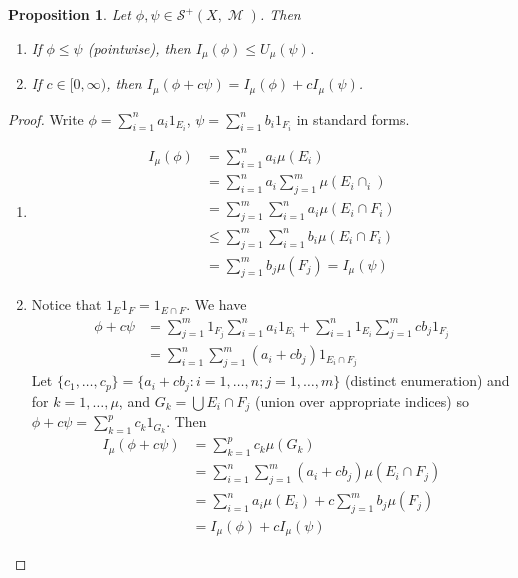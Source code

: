 \documentclass[12pt, a4paper]{memoir}
\newtheorem{proposition}[theorem]{Proposition}
\theoremstyle{nonumberplain}
\newtheorem{proof}{Proof}
\DeclareMathOperator{\M}{\mathcal{M}}
\begin{document}
\begin{proposition}
    Let $\phi,\psi\in\mathcal{S}^+(X,\M)$.
    Then
    \begin{enumerate}[nolistsep,label=(\roman*)]
        \item If $\phi\leq\psi$ (pointwise), then $I_\mu(\phi)\leq U_\mu(\psi)$.
        \item If $c\in[0,\infty)$, then $I_\mu(\phi+c\psi)=I_\mu(\phi)+cI_\mu(\psi)$.
    \end{enumerate}
\end{proposition}
\begin{proof}
    Write $\phi=\sum_{i=1}^n a_i1_{E_i}$, $\psi=\sum_{i=1}^n b_i1_{F_i}$ in standard forms.
    \begin{enumerate}[nolistsep,label=(\roman*)]
        \item
            \begin{align*}
                I_\mu(\phi) &= \sum\limits_{i=1}^na_i\mu(E_i)\\
                            &=\sum\limits_{i=1}^n a_i\sum\limits_{j=1}^m \mu(E_i\cap _i)\\
                            &=\sum\limits_{j=1}^m\sum\limits_{i=1}^na_i\mu(E_i\cap F_i)\\
                            &\leq \sum\limits_{j=1}^m\sum\limits_{i=1}^n b_i\mu(E_i\cap F_i)\\
                            &= \sum\limits_{j=1}^m b_j\mu(F_j)=I_\mu(\psi)
            \end{align*}
        \item Notice that $1_E1_F=1_{E\cap F}$.
            We have
            \begin{align*}
                \phi+c\psi&=\sum\limits_{j=1}^m 1_{F_j}\sum\limits_{i=1}^n a_i1_{E_i}+\sum\limits_{i=1}^n 1_{E_i}\sum\limits_{j=1}^m cb_j1_{F_j}\\
                          &=\sum\limits_{i=1}^n\sum\limits_{j=1}^m(a_i+cb_j)1_{E_i\cap F_j}
            \end{align*}
            Let $\{c_1,\ldots,c_p\}=\{a_i+cb_j:i=1,\ldots,n;j=1,\ldots,m\}$ (distinct enumeration) and for $k=1,\ldots,\mu$, and $G_k=\bigcup E_i\cap F_j$ (union over appropriate indices) so $\phi+c\psi=\sum_{k=1}^p c_k 1_{G_k}$.
            Then
            \begin{align*}
                I_\mu(\phi+c\psi)&=\sum\limits_{k=1}^p c_k\mu(G_k)\\
                                 &=\sum\limits_{i=1}^n\sum\limits_{j=1}^m (a_i+cb_j)\mu(E_i\cap F_j)\\
                                 &= \sum\limits_{i=1}^n a_i\mu(E_i)+c\sum\limits_{j=1}^m b_j\mu(F_j)\\
                                 &= I_\mu(\phi)+cI_\mu(\psi)
            \end{align*}
    \end{enumerate}
\end{proof}
\end{document}
